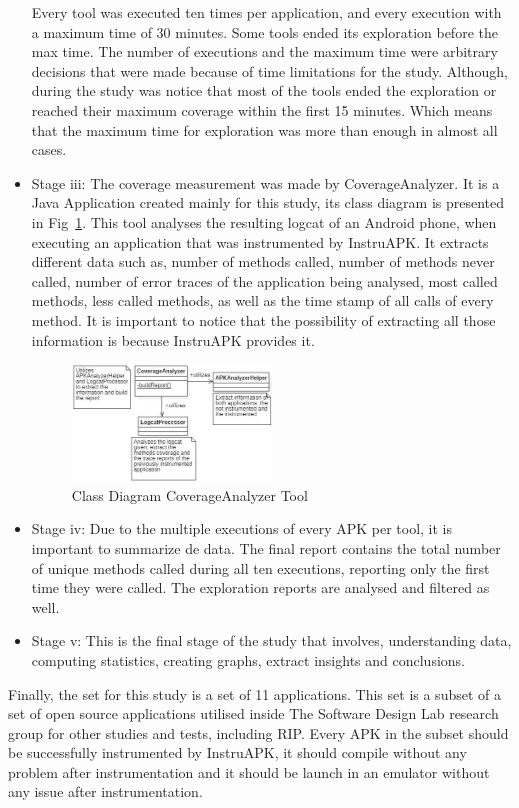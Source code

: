 \begin{itemize}
Every tool was executed ten times per application, and every execution with a maximum time of 30 minutes. Some tools ended its exploration before the max time. 
The number of executions and the maximum time were arbitrary decisions that were made because of time limitations for the study. Although, during the study was notice that most of the tools ended the exploration or reached their maximum coverage within the first 15 minutes. Which means that the maximum time for exploration was more than enough in almost all cases.

	\item Stage iii: The coverage measurement was made by CoverageAnalyzer. It is a Java Application created mainly for this study, its class diagram is presented in Fig~\ref{fig:classDiagramCA}. This tool analyses the resulting logcat of an Android phone, when executing an application that was instrumented by InstruAPK. It extracts different data such as, number of methods called, number of  methods never called, number of error traces of the application being analysed, most called methods, less called methods, as well as the time stamp of all calls of every method. It is important to notice that the possibility of extracting all those information is because InstruAPK provides it.
	
\begin{figure}
	\centering
	\includegraphics[width=0.5\textwidth]{img/ClassDiagramCA.jpg}
	\vspace{-0.5cm}
	\caption{Class Diagram CoverageAnalyzer Tool}
	\label{fig:classDiagramCA}
\end{figure}

	\item Stage iv: Due to the multiple executions of every APK per tool, it is important to summarize de data. The final report contains the total number of unique methods called during all ten executions, reporting only the first time they were called.
The exploration reports are analysed and filtered as well.

	\item Stage v: This is the final stage of the study that involves, understanding data, computing statistics, creating graphs, extract insights and conclusions. 

\end{itemize}

Finally, the set for this study is a set of 11 applications. This set is a subset of a set of open source applications utilised inside The Software Design Lab research group for other studies and tests, including RIP. Every APK in the subset should be successfully instrumented by InstruAPK, it should compile without any problem after instrumentation and it should be launch in an emulator without any issue after instrumentation.
